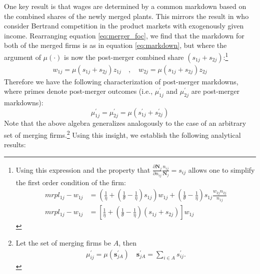 \documentclass[12pt]{article}
\theoremstyle{prop}
\begin{document}
One key result  is that wages are determined by a common markdown based on the combined shares of the newly merged plants. This mirrors the result in \citet{nocke2018multiproduct} who consider Bertrand competition in the product markets with exogenously given income. Rearranging equation \eqref{eq:merger_foc}, we find that the markdown for both of the merged firms is as in equation \eqref{eq:markdown}, but where the argument of $\mu(\cdot)$ is now the post-merger combined share $(s_{1j}+s_{2j})$:\footnote{
    Using this expression and the property that $ \frac{\partial \mathbf{N}_j}{\partial n_{ij}} \frac{n_{ij}}{\mathbf{N}_j}=s_{ij}$ allows one to simplify the first order condition of the firm:
	\begin{align*}
		mrpl_{1j}-w_{1j} & =\left(\frac{1}{\eta}+\left(\frac{1}{\theta}-\frac{1}{\eta}\right)s_{1j}\right)w_{1j}+\left(\frac{1}{\theta}-\frac{1}{\eta}\right)s_{1j}\frac{w_{2j}n_{2j}}{n_{1j}}\\
		mrpl_{1j}-w_{1j} & =\left[\frac{1}{\eta}+\left(\frac{1}{\theta}-\frac{1}{\eta}\right)\left(s_{1j}+s_{2j}\right)\right]w_{1j}
\end{align*}}
\begin{align*}
w_{1j}=\mu\left(s_{1j}+s_{2j}\right)z_{1j}
\quad,\quad
w_{2j}=\mu\left(s_{1j}+s_{2j}\right)z_{2j}
\end{align*}
Therefore we have the following characterization of post-merger markdowns, where primes denote post-merger outcomes (i.e., $\mu_{1j}^{\prime}$ and $\mu_{2j}^{\prime}$ are post-merger markdowns):
$$\mu_{1j}^{\prime}=\mu_{2j}^{\prime}=\mu\left(s_{1j}^{\prime}+s_{2j}^{\prime}\right)$$
Note that the above algebra generalizes analogously to the case of an arbitrary set of merging firms.\footnote{Let the set of merging firms be $A$, then
\begin{align}
	\label{eq:mu_ij_general}
\mu_{ij}^{\prime}=\mu\left(\boldsymbol{s}_{jA}^{\prime}\right)\quad\boldsymbol{s}_{jA}^{\prime}=\sum_{i\in A}s_{ij}^{\prime}.
\end{align}}
  Using this insight, we establish the following analytical results:
\end{document}
